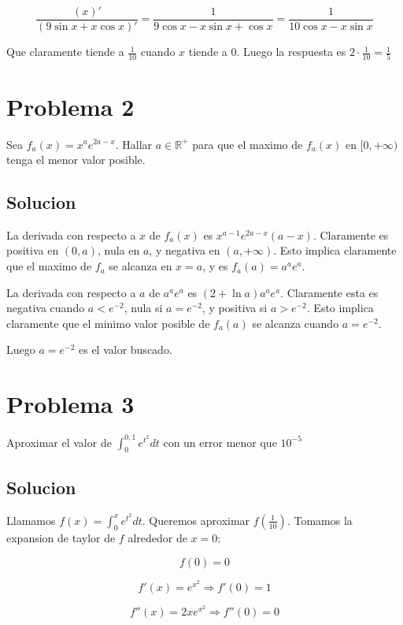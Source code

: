 \documentclass{article}
\begin{document}
$$\frac{(x)'}{(9 \sin x + x \cos x)'} = \frac{1}{9 \cos x - x \sin x + \cos x} = \frac{1}{10 \cos x - x \sin x}$$

Que claramente tiende a $\frac{1}{10}$ cuando $x$ tiende a $0$. Luego la respuesta es $2 \cdot \frac{1}{10} = \frac{1}{5}$

\pagebreak

\section{Problema 2}

Sea $f_a(x) = x^ae^{2a-x}$. Hallar $a \in \mathbb{R}^+$ para que el maximo de $f_a(x)$ en $\lbrack 0,+\infty)$ tenga el menor valor posible.

\subsection{Solucion}

La derivada con respecto a $x$ de $f_a(x)$ es $x^{a-1}e^{2a-x}(a-x)$. Claramente es positiva en $(0,a)$, nula en $a$, y negativa en $(a,+\infty)$.
Esto implica claramente que el maximo de $f_a$ se alcanza en $x = a$, y es $f_a(a) = a^ae^a$.

La derivada con respecto a $a$ de $a^ae^a$ es $(2+\ln a)a^ae^a$. Claramente esta es negativa cuando $a < e^{-2}$, nula si $a = e^{-2}$,
y positiva si $a > e^{-2}$. Esto implica claramente que el minimo valor posible de $f_a(a)$ se alcanza cuando $a = e^{-2}$.

Luego $a = e^{-2}$ es el valor buscado.

\section{Problema 3}

Aproximar el valor de $\int_0^{0,1}{e^{t^2}dt}$ con un error menor que $10^{-5}$

\subsection{Solucion}

Llamamos $f(x) = \int_0^{x}{e^{t^2}dt}$. Queremos aproximar $f(\frac{1}{10})$. Tomamos la expansion de taylor de $f$ alrededor de $x = 0$:

$$f(0) = 0$$

$$f'(x) = e^{x^2} \Rightarrow f'(0) = 1$$

$$f''(x) = 2xe^{x^2} \Rightarrow f''(0) = 0$$
\end{document}
